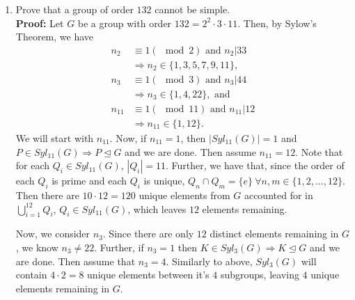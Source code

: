 \documentclass{article}
\begin{document}
\begin{enumerate}
    Assume $n_q = p$. Now, since $n_q \equiv 1(\mod{q})$, we must have that $n_q \in \{1, q+1, 2q+1, \dots \}$, so $p \in \{1,q+1,2q+1, 
    \dots \}$. But $1 < p < q$, so we have a contradiction (since $p < q \Longrightarrow p < q+1$).

    Then assume that $n_q = p^2$. Now, since $|Q| = q$ and there are $p^2$ sylow $q$-subgroups in $G$, we must have that the total number 
    of elements (not counting the identity) that are accounted for in the sylow $q$-subgroups is $p^2(q-1) = p^2q-p^2$. This means that 
    there are exactly $p^2$ elements of $G$ remaining to be accounted for, all of which must be elements of $P \in Syl_p(G)$. Since $P 
    \in Syl_p(G) \Longrightarrow |P| = p^2$, we must only have one sylow $p$-subgroup of $G$. That is, $n_p = 1$. Then $P \trianglelefteq G$ 
    and $G$ is not simple. $\square$
    
    \item Prove that a group of order $132$ cannot be simple.\\
    \textbf{Proof:} Let $G$ be a group with order $132 = 2^2 \cdot 3 \cdot 11$. Then, by Sylow's Theorem, we have
    \begin{align*}
        n_2 &\equiv 1(\mod{2}) \text{ and } n_2 \big| 33 \\
        &\Longrightarrow n_2 \in \{1,3,5,7,9,11\}, \\
        n_3 &\equiv 1(\mod{3}) \text{ and } n_3 \big| 44 \\
        &\Longrightarrow n_3 \in \{1,4,22\}, \text{ and }\\
        n_{11} &\equiv 1(\mod{11}) \text{ and } n_{11} \big| 12 \\
        &\Longrightarrow n_{11} \in \{1,12\}.
    \end{align*}
    We will start with $n_{11}$. Now, if $n_{11}=1$, then $|Syl_{11}(G)| = 1$ and $P \in Syl_{11}(G) \Longrightarrow P \trianglelefteq G$ 
    and we are done. Then assume $n_{11}=12$. Note that for each $Q_i \in Syl_{11}(G)$, $|Q_i| = 11$. Further, we have that, since the order 
    of each $Q_i$ is prime and each $Q_i$ is unique, $Q_n \cap Q_m = \{e\} \ \forall n,m \in \{1,2, \dots, 12\}$. Then there are $10 \cdot 
    12 = 120$ unique elements from $G$ accounted for in $\bigcup_{i =1}^{12}{Q_i}$, $Q_i \in Syl_{11}(G)$, which leaves $12$ elements 
    remaining.

    Now, we consider $n_3$. Since there are only $12$ distinct elements remaining in $G$, we know $n_3 \neq 22$. Further, if $n_3=1$ then 
    $K \in Syl_3(G) \Longrightarrow K \trianglelefteq G$ and we are done. Then assume that $n_3 = 4$. Similarly to above, $Syl_3(G)$ will 
    contain $4 \cdot 2 = 8$ unique elements between it's $4$ subgroups, leaving $4$ unique elements remaining in $G$.


\end{enumerate}
\end{document}
